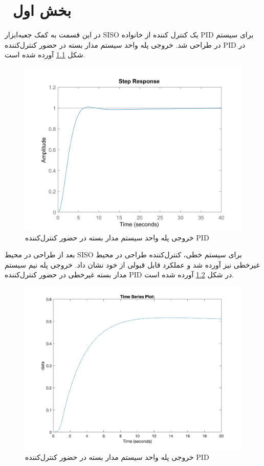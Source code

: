 \chapter{ بخش اول}\label{part_I}
در این قسمت به کمک جعبه‌ابزار SISO یک کنترل کننده از خانواده PID برای سیستم در طراحی شد. خروجی پله واحد سیستم مدار بسته در حضور کنترل‌کننده PID در شکل
\ref{PID}
آورده شده است.
 \begin{figure}[H]
	\includegraphics[width=12cm]{../Figure/P_I/PID.png}
	\centering
	\caption{خروجی پله واحد سیستم مدار بسته در حضور کنترل‌کننده PID}
	\label{PID}
\end{figure}
 بعد از طراحی در محیط SISO برای سیستم خطی، کنترل‌کننده طراحی در محیط غیرخطی نیز آورده شد و عملکرد قابل قبولی از خود نشان داد.
 خروجی پله نیم سیستم مدار بسته غیرخطی در حضور کنترل‌کننده PID در شکل
\ref{PID_non}
 آورده شده است.
   \begin{figure}[H]
 	\includegraphics[width=12cm]{../Figure/P_I/PID_nonlinear.png}
 	\centering
 	\caption{خروجی پله واحد سیستم مدار بسته در حضور کنترل‌کننده PID}
 	\label{PID_non}
 \end{figure}
